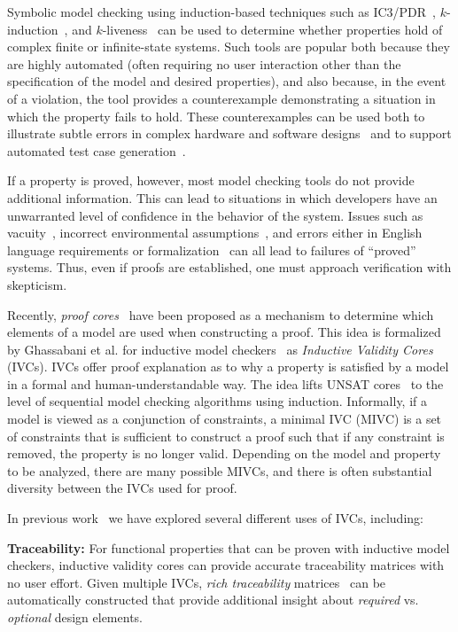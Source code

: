 Symbolic model checking using induction-based techniques such as IC3/PDR~\cite{Een2011:PDR}, $k$-induction~\cite{SheeranSS00}, and $k$-liveness~\cite{conf/fmcad/ClaessenS12} can be used to determine whether properties hold of complex finite or infinite-state systems.  Such tools are popular both because they are highly automated (often requiring no user interaction other than the specification of the model and desired properties), and also because, in the event of a violation, the tool provides a counterexample demonstrating a situation in which the property fails to hold.  These counterexamples can be used both to illustrate subtle errors in complex hardware and software designs~\cite{hilt2013,McMillan99:compositional,Miller10:CACM} and to support automated test case generation~\cite{Whalen13:OMCDC,You15:dse}.

If a property is proved, however, most model checking tools do not provide additional information.  This can lead to situations in which developers have an unwarranted level of confidence in the behavior of the system.  Issues such as vacuity~\cite{Kupferman03:Vacuity}, incorrect environmental assumptions~\cite{Whalen07:FMICS}, and errors either in English language requirements or formalization~\cite{Pike06:axioms} can all lead to failures of ``proved'' systems.  Thus, even if proofs are established, one must approach verification with skepticism.

Recently, {\em proof cores}~\cite{jasper_gold} have been proposed as a mechanism to determine which elements of a model are used when constructing a proof.  This idea is formalized by Ghassabani et al. for inductive model checkers~\cite{Ghass16} as {\em Inductive Validity Cores} (IVCs). IVCs offer proof explanation as to why a property is satisfied by a model in a formal and human-understandable way.  The idea lifts UNSAT cores~\cite{zhang2003extracting}
to the level of sequential model checking algorithms using induction.  Informally, if a model is viewed as a conjunction of constraints,
a minimal IVC (MIVC) is a set of constraints that is sufficient to construct a proof such that if any constraint is removed, the property is no longer valid.  
%
Depending on the model and property to be analyzed, there are many possible MIVCs, and there is often substantial diversity between the IVCs used for proof.  

In previous work~\cite{Ghass16,Murugesan16:renext,Ghass17Cov,Ghass17AllIVCs} we have explored several different uses of IVCs, including: 

\noindent \textbf{Traceability: } For functional properties that can be proven with inductive model checkers, inductive validity cores can provide accurate traceability matrices with no user effort.  Given multiple IVCs, {\em rich traceability} matrices~\cite{Murugesan16:renext} can be automatically constructed that provide additional insight about {\em required} vs. {\em optional} design elements.

